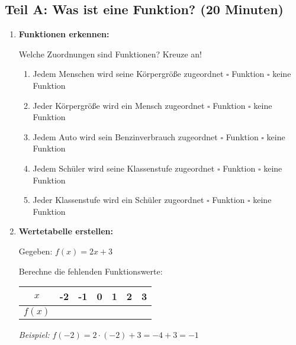 \subsection*{Teil A: Was ist eine Funktion? (20 Minuten)}

\begin{enumerate}[label=\arabic*.]

    \item \textbf{Funktionen erkennen:}

    Welche Zuordnungen sind Funktionen? Kreuze an!

    \vspace{0.5cm}
    \begin{enumerate}[label=\alph*)]
        \item Jedem Menschen wird seine Körpergröße zugeordnet \hspace{3cm} $\square$ Funktion \hspace{1cm} $\square$ keine Funktion

        \item Jeder Körpergröße wird ein Mensch zugeordnet \hspace{3cm} $\square$ Funktion \hspace{1cm} $\square$ keine Funktion

        \item Jedem Auto wird sein Benzinverbrauch zugeordnet \hspace{3cm} $\square$ Funktion \hspace{1cm} $\square$ keine Funktion

        \item Jedem Schüler wird seine Klassenstufe zugeordnet \hspace{3cm} $\square$ Funktion \hspace{1cm} $\square$ keine Funktion

        \item Jeder Klassenstufe wird ein Schüler zugeordnet \hspace{3cm} $\square$ Funktion \hspace{1cm} $\square$ keine Funktion
    \end{enumerate}

    \vspace{1cm}

    \item \textbf{Wertetabelle erstellen:}

    Gegeben: $f(x) = 2x + 3$

    Berechne die fehlenden Funktionswerte:

    \begin{center}
        \begin{tabular}{|c|c|c|c|c|c|c|}
            \hline
            $x$ & -2 & -1 & 0 & 1 & 2 & 3 \\
            \hline
            $f(x)$ & & & & & & \\
            \hline
        \end{tabular}
    \end{center}

    \textit{Beispiel:} $f(-2) = 2 \cdot (-2) + 3 = -4 + 3 = -1$

    \vspace{1cm}

\end{enumerate}